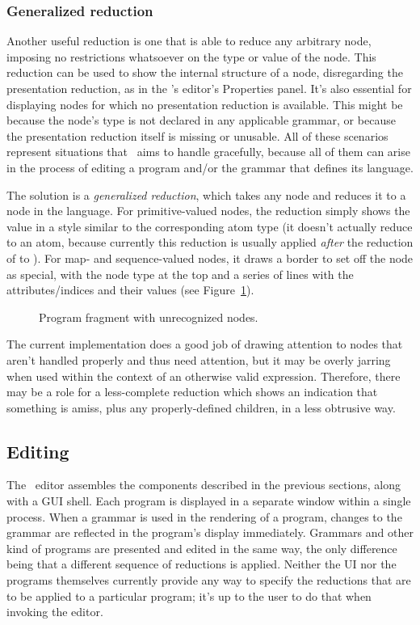 \subsubsection{Generalized reduction}
Another useful reduction is one that is able to reduce any arbitrary node, imposing no restrictions whatsoever on the type or value of the node. This reduction can be used to show the internal structure of a node, disregarding the presentation reduction, as in the \Meta's editor's Properties panel. It's also essential for displaying nodes for which no presentation reduction is available. This might be because the node's type is not declared in any applicable grammar, or because the presentation reduction itself is missing or unusable. All of these scenarios represent situations that \Meta\ aims to handle gracefully, because all of them can arise in the process of editing a program and/or the grammar that defines its language.

The solution is a \emph{generalized reduction}, which takes any node and reduces it to a node in the  language. For primitive-valued nodes, the reduction simply shows the value in a style similar to the corresponding  atom type (it doesn't actually reduce to an atom, because currently this reduction is usually applied \emph{after} the reduction of  to ). For map- and sequence-valued nodes, it draws a border to set off the node as special, with the node type at the top and a series of lines with the attributes/indices and their values (see Figure\ \ref{fig-general}).

\begin{figure}[ht]
\caption{\label{fig-general} Program fragment with unrecognized nodes.}
\end{figure}

The current implementation does a good job of drawing attention to nodes that aren't handled properly and thus need attention, but it may be overly jarring when used within the context of an otherwise valid expression. Therefore, there may be a role for a less-complete reduction which shows an indication that something is amiss, plus any properly-defined children, in a less obtrusive way.


%
%
\subsection{Editing}
The \Meta\ editor assembles the components described in the previous sections, along with a GUI shell. Each program is displayed in a separate window within a single process. When a grammar is used in the rendering of a program, changes to the grammar are reflected in the program's display immediately. Grammars and other kind of programs are presented and edited in the same way, the only difference being that a different sequence of reductions is applied. Neither the UI nor the programs themselves currently provide any way to specify the reductions that are to be applied to a particular program; it's up to the user to do that when invoking the editor.


